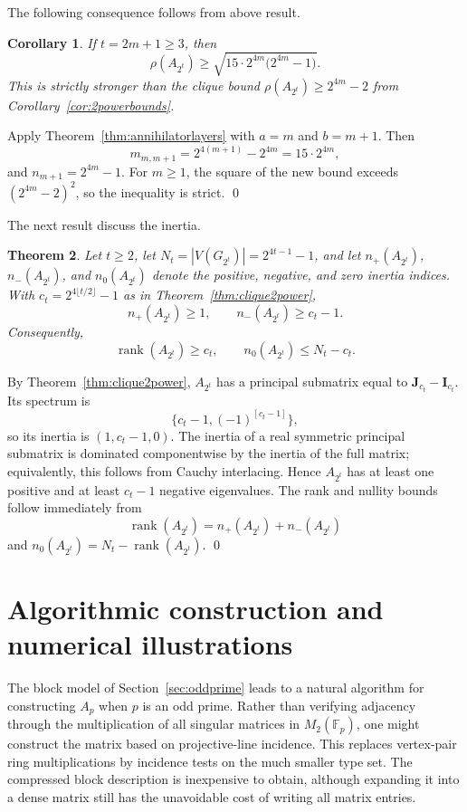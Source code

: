 \documentclass[12pt]{article}
\renewenvironment{proof}{{\bf \noindent Proof.}}{\qed}
\newtheorem{theorem}{Theorem}[section]
\newtheorem{corollary}[theorem]{Corollary}
\theoremstyle{definition}
\newcommand{\F}{\mathbb{F}}
\newcommand{\I}{\mathbf{I}}
\newcommand{\J}{\mathbf{J}}
\newcommand{\rank}{\operatorname{rank}}
\begin{document}
	The following consequence follows from above result.
	\begin{corollary}\label{cor:oddtexplicit}
		If $t=2m+1\ge3$, then
		$$
		\rho(A_{2^t})\ge
		\sqrt{15\cdot2^{4m}\bigl(2^{4m}-1\bigr)}.
		$$
		This is strictly stronger than the clique bound $\rho(A_{2^t})\ge2^{4m}-2$ from Corollary~\ref{cor:2powerbounds}.
	\end{corollary}
	
	\begin{proof}
		Apply Theorem~\ref{thm:annihilatorlayers} with $a=m$ and $b=m+1$. Then
		$$
		m_{m,m+1}=2^{4(m+1)}-2^{4m}=15\cdot2^{4m},
		$$
		and $n_{m+1}=2^{4m}-1$. For $m\ge1$, the square of the new bound exceeds $(2^{4m}-2)^2$, so the inequality is strict.
	\end{proof}
	
	\medskip
	
	The next result discuss the inertia.
	\begin{theorem}\label{thm:twoadic-inertia}
		Let $t\ge2$, let $N_t=|V(G_{2^t})|=2^{4t-1}-1$, and let $n_+(A_{2^t})$, $n_-(A_{2^t})$, and $n_0(A_{2^t})$ denote the positive, negative, and zero inertia indices. With $c_t=2^{4\lfloor t/2\rfloor}-1$ as in Theorem~\ref{thm:clique2power},
		$$
		n_+(A_{2^t})\ge1,
		\qquad
		n_-(A_{2^t})\ge c_t-1.
		$$
		Consequently,
		$$
		\rank(A_{2^t})\ge c_t,
		\qquad
		n_0(A_{2^t})\le N_t-c_t.
		$$
	\end{theorem}
	
	\begin{proof}
		By Theorem~\ref{thm:clique2power}, $A_{2^t}$ has a principal submatrix equal to $\J_{c_t}-\I_{c_t}$. Its spectrum is
		$$
		\{c_t-1,(-1)^{[c_t-1]}\},
		$$
		so its inertia is $(1,c_t-1,0)$. The inertia of a real symmetric principal submatrix is dominated componentwise by the inertia of the full matrix; equivalently, this follows from Cauchy interlacing. Hence $A_{2^t}$ has at least one positive and at least $c_t-1$ negative eigenvalues. The rank and nullity bounds follow immediately from
		$$
		\rank(A_{2^t})=n_+(A_{2^t})+n_-(A_{2^t})
		$$
		and $n_0(A_{2^t})=N_t-\rank(A_{2^t})$.
	\end{proof}
	
	\section{Algorithmic construction and numerical illustrations}\label{sec:algorithm}
	
	The block model of Section~\ref{sec:oddprime} leads to a natural algorithm for constructing $A_p$ when $p$ is an odd prime.
	Rather than verifying adjacency through the multiplication of all singular matrices in $M_2(\F_p)$, one might construct the matrix based on projective-line incidence. This replaces vertex-pair ring multiplications by incidence tests on the much smaller type set. The compressed block description is inexpensive to obtain, although expanding it into a dense matrix still has the unavoidable cost of writing all matrix entries.
	
\end{document}
